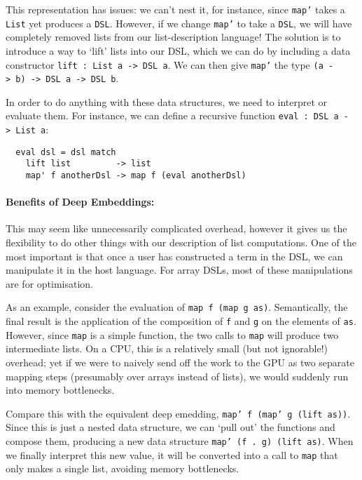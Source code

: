 \documentclass[a4paper,12pt]{article}
\newcommand{\icf}[1]{\mbox{\texttt{#1}}}
\begin{document}
This representation has issues: we can't nest it, for instance, since \icf{map'} takes a \icf{List} yet produces a \icf{DSL}. 
However, if we change \icf{map'} to take a \icf{DSL}, we will have completely removed lists from our list-description language! 
The solution is to introduce a way to `lift' lists into our DSL, which we can do by  including a data constructor \texttt{lift\ :\ List\ a\ ->\ DSL\ a}. 
We can then give \icf{map'} the type \icf{(a\ ->\ b)\ ->\ DSL\ a\ ->\ DSL\ b}.

In order to do anything with these data structures, we need to interpret or evaluate them. 
For instance, we can define a recursive function \icf{eval\ :\ DSL\ a\ ->\ List\ a}:

\begin{verbatim}
  eval dsl = dsl match
    lift list         -> list
    map' f anotherDsl -> map f (eval anotherDsl)
\end{verbatim}

\paragraph*{Benefits of Deep Embeddings:}
This may seem like unnecessarily complicated overhead, however it gives us the flexibility to do other things with our description of list computations. 
One of the most important is that once a user has constructed a term in the DSL, we can manipulate it in the host language. 
For array DSLs, most of these manipulations are for optimisation.

As an example, consider the evaluation of \icf{map\ f\ (map\ g\ as)}. 
Semantically, the final result is the application of the composition of \icf{f} and \icf{g} on the elements of \icf{as}. 
However, since \icf{map} is a simple function, the two calls to \icf{map} will produce two intermediate lists. 
On a CPU, this is a relatively small (but not ignorable!) overhead; yet if we were to naively send off the work to the GPU as two separate mapping steps (presumably over arrays instead of lists), we would suddenly run into memory bottlenecks.

Compare this with the equivalent deep emedding, \icf{map'\ f\ (map'\ g\ (lift\ as))}. 
Since this is just a nested data structure, we can `pull out' the functions and compose them, producing a new data structure \icf{map'\ (f\ .\ g)\ (lift\ as)}.
When we finally interpret this new value, it will be converted into a call to \icf{map} that only makes a single list, avoiding memory bottlenecks.
\end{document}
